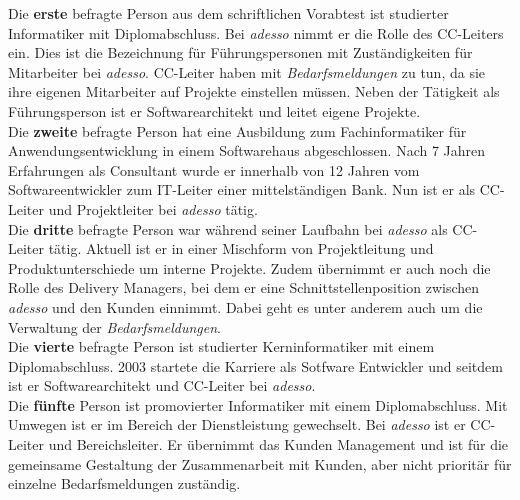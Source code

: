 Die \textbf{erste} befragte Person aus dem schriftlichen Vorabtest ist studierter Informatiker mit Diplomabschluss. Bei \emph{adesso} nimmt er die Rolle des CC-Leiters ein. Dies ist die Bezeichnung für Führungspersonen mit Zuständigkeiten für Mitarbeiter bei \emph{adesso}. CC-Leiter haben mit \emph{Bedarfsmeldungen} zu tun, da sie ihre eigenen Mitarbeiter auf Projekte einstellen müssen. Neben der Tätigkeit als Führungsperson ist er Softwarearchitekt und leitet eigene Projekte.\\
Die \textbf{zweite} befragte Person hat eine Ausbildung zum Fachinformatiker für Anwendungsentwicklung in einem Softwarehaus abgeschlossen. Nach 7 Jahren Erfahrungen als Consultant wurde er innerhalb von 12 Jahren vom Softwareentwickler zum IT-Leiter einer mittelständigen Bank. Nun ist er als CC-Leiter und Projektleiter bei \emph{adesso} tätig.\\
Die \textbf{dritte} befragte Person war während seiner Laufbahn bei \emph{adesso} als CC-Leiter tätig. Aktuell ist er in einer Mischform von Projektleitung und Produktunterschiede um interne Projekte. Zudem übernimmt er auch noch die Rolle des Delivery Managers, bei dem er eine Schnittstellenposition zwischen \emph{adesso} und den Kunden einnimmt. Dabei geht es unter anderem auch um die Verwaltung der \emph{Bedarfsmeldungen}.\\
Die \textbf{vierte} befragte Person ist studierter Kerninformatiker mit einem Diplomabschluss. 2003 startete die Karriere als Sotfware Entwickler und seitdem ist er Softwarearchitekt und CC-Leiter bei \emph{adesso}.\\
Die \textbf{fünfte} Person ist promovierter Informatiker mit einem Diplomabschluss. Mit Umwegen ist er im Bereich der Dienstleistung gewechselt. Bei \emph{adesso} ist er CC-Leiter und Bereichsleiter. Er übernimmt das Kunden Management und ist für die gemeinsame Gestaltung der Zusammenarbeit mit Kunden, aber nicht prioritär für einzelne Bedarfsmeldungen zuständig.






